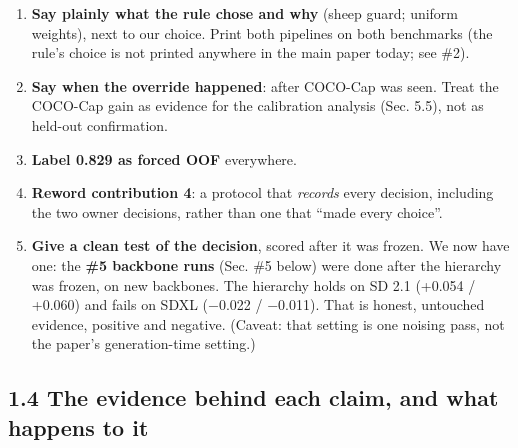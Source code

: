\documentclass[
  10pt,
]{article}
\providecommand{\tightlist}{%
  \setlength{\itemsep}{0pt}\setlength{\parskip}{0pt}}
\begin{document}
\begin{enumerate}
\def\labelenumi{\arabic{enumi}.}
\tightlist
\item
  \textbf{Say plainly what the rule chose and why} (sheep guard; uniform
  weights), next to our choice. Print both pipelines on both benchmarks
  (the rule's choice is not printed anywhere in the main paper today;
  see \#2).
\item
  \textbf{Say when the override happened}: after COCO-Cap was seen.
  Treat the COCO-Cap gain as evidence for the calibration analysis (Sec.
  5.5), not as held-out confirmation.
\item
  \textbf{Label 0.829 as forced OOF} everywhere.
\item
  \textbf{Reword contribution 4}: a protocol that \emph{records} every
  decision, including the two owner decisions, rather than one that
  ``made every choice''.
\item
  \textbf{Give a clean test of the decision}, scored after it was
  frozen. We now have one: the \textbf{\#5 backbone runs} (Sec. \#5
  below) were done after the hierarchy was frozen, on new backbones. The
  hierarchy holds on SD 2.1 (+0.054 / +0.060) and fails on SDXL (\ensuremath{-}0.022
  / \ensuremath{-}0.011). That is honest, untouched evidence, positive and negative.
  (Caveat: that setting is one noising pass, not the paper's
  generation-time setting.)
\end{enumerate}

\subsection{1.4 The evidence behind each claim, and what happens to it}
\end{document}
